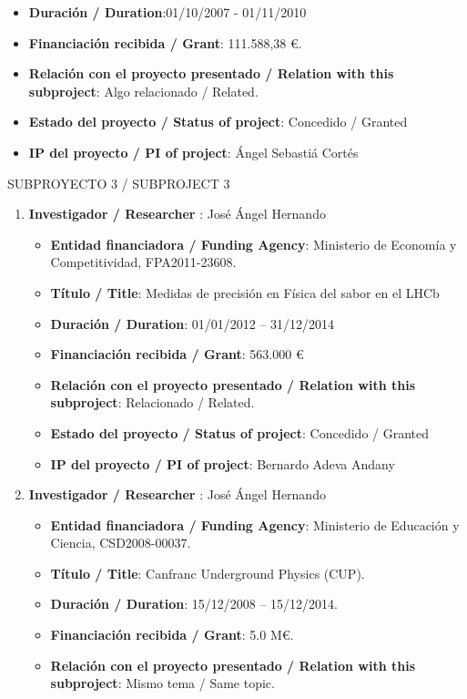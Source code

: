 \begin{enumerate}
\begin{itemize}
\item {\bf Duración / Duration}:01/10/2007 - 01/11/2010 
\item {\bf Financiación recibida / Grant}: 111.588,38 \euro. 
\item {\bf Relación con el proyecto presentado / Relation with this subproject}: Algo relacionado / Related. 
\item {\bf Estado del proyecto / Status of project}: Concedido / Granted
\item {\bf IP del proyecto / PI of project}: Ángel Sebastiá Cortés 
\end{itemize}
\end{enumerate}


{\sc SUBPROYECTO 3 / SUBPROJECT 3}

\begin{enumerate}
\item {\bf Investigador / Researcher }: José Ángel Hernando
\begin{itemize}
\item {\bf Entidad financiadora / Funding Agency}: Ministerio de Econom\'ia y Competitividad, FPA2011-23608.  
\item {\bf Título / Title}:  Medidas de precisi\'on en F\'isica del sabor en el LHCb
\item {\bf Duración / Duration}: 01/01/2012 -- 31/12/2014
\item {\bf Financiación recibida / Grant}: 563.000 \euro 
\item {\bf Relación con el proyecto presentado / Relation with this subproject}: Relacionado / Related. 
\item {\bf Estado del proyecto / Status of project}: Concedido / Granted
\item {\bf IP del proyecto / PI of project}: Bernardo Adeva Andany
\end{itemize}
\item {\bf Investigador / Researcher }: José Ángel Hernando
\begin{itemize}
\item {\bf Entidad financiadora / Funding Agency}: Ministerio de Educaci\'on y Ciencia, CSD2008-00037.
\item {\bf Título / Title}:  Canfranc Underground Physics (CUP).
\item {\bf Duración / Duration}: 15/12/2008 -- 15/12/2014. 
\item {\bf Financiación recibida / Grant}: 5.0 M\euro. 
\item {\bf Relación con el proyecto presentado / Relation with this subproject}: Mismo tema / Same topic. 

\end{itemize}
\end{enumerate}
